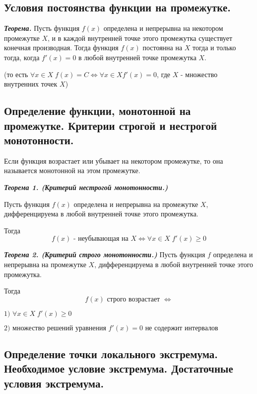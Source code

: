 \documentclass[a4paper,12pt]{article}
\theoremstyle{plain} %
\theoremstyle{definition} %
\theoremstyle{remark} %
\begin{document}
\newpage
\subsection*{Условия постоянства функции на промежутке.                                                }

\textbf{\textit{Теорема.}} Пусть функция $f(x)$ определена и непрерывна на некотором промежутке $X$, и в каждой внутренней точке этого промежутка существует конечная производная. Тогда функция $f(x)$ постоянна на $X$ тогда и только тогда, когда $f'(x) = 0$ в любой внутренней точке промежутка $X$.

(то есть $\forall x \in X \; f(x) = C \Leftrightarrow \forall x \in X f'(x) = 0$, где $X$ - множество внутренних точек $X$)


\newpage
\subsection*{Определение функции, монотонной на промежутке. Критерии строгой и нестрогой монотонности. }

Если функция возрастает или убывает на некотором промежутке, то она называется монотонной на этом промежутке.

\textit{\textbf{Теорема 1. (Критерий нестрогой монотонности.)}}

Пусть функция $f(x)$ определена и непрерывна на промежутке $X$, дифференцируема в любой внутренней точке этого промежутка.

Тогда
\[ f(x) \text{ - неубывающая на }X \Leftrightarrow \forall x \in X \; f'(x) \geq 0 \]

\textit{\textbf{Теорема 2. (Критерий строго монотонности.)}}
Пусть функция $f$ определена и непрерывна на промежутке $X$, дифференцируема в любой внутренней точке этого промежутка.

Тогда
\[
	f(x) \text{ строго возрастает } \Leftrightarrow \]

$\text{1) } \forall x \in X \; f'(x) \geq 0  $

$\text{2) множество решений уравнения } f'(x) = 0 \text{ не содержит интервалов} $


\newpage
\subsection*{Определение точки локального экстремума. Необходимое условие экстремума. Достаточные условия экстремума. }
\end{document}
